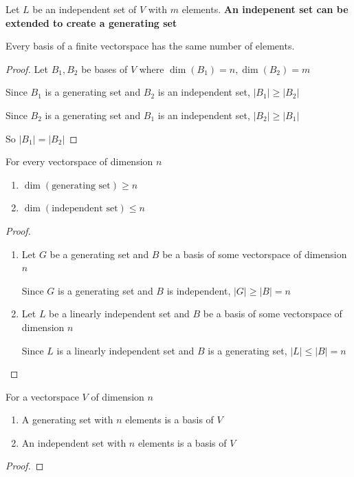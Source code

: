 \documentclass[11pt]{article}
\begin{document}
\begin{theorem}
Let \(L\) be an independent set of \(V\) with \(m\) elements.
\textbf{An indepenent set can be extended to create a generating set}
\end{theorem}

\begin{theorem}
Every basis of a finite vectorspace has the same number of elements.
\end{theorem}
\begin{proof}
Let \(B_1, B_2\) be bases of \(V\) where \(\dim (B_1) = n, \dim(B_2) = m\)

Since \(B_1\) is a generating set and \(B_2\) is an independent set, \(|B_1| \geq |B_2|\)

Since \(B_2\) is a generating set and \(B_1\) is an independent set, \(|B_2| \geq |B_1|\)

So \(|B_1| = |B_2|\)
\end{proof}

\begin{theorem}
For every vectorspace of dimension \(n\)

\begin{enumerate}
\item \(\dim(\text{generating set}) \geq n\)

\item \(\dim(\text{independent set}) \leq n\)
\end{enumerate}
\end{theorem}
\begin{proof}
\begin{enumerate}
\item Let \(G\) be a generating set and \(B\) be a basis of some vectorspace of dimension \(n\)

Since \(G\) is a generating set and \(B\) is independent, \(|G| \geq |B| = n\)

\item Let \(L\) be a linearly independent set and \(B\) be a basis of some vectorspace of dimension \(n\)

Since \(L\) is a linearly independent set and \(B\) is a generating set, \(|L| \leq |B| = n\)
\end{enumerate}
\end{proof}

\begin{theorem}
For a vectorspace \(V\) of dimension \(n\)

\begin{enumerate}
\item A generating set with \(n\) elements is a basis of \(V\)

\item An independent set with \(n\) elements is a basis of \(V\)
\end{enumerate}
\end{theorem}
\begin{proof}

\end{proof}
\end{document}
